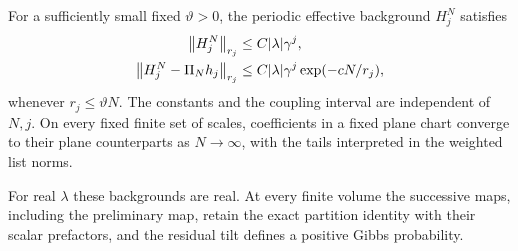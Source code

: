 \begin{proposition}\label{flow:torus}
For a sufficiently small fixed $\vartheta>0$, the periodic effective
background $H_j^N$ satisfies
\begin{align}
 \left\|H_j^N\right\|_{r_j}&\le C|\lambda|\gamma^j,
                                      \label{flow:torus-small}\\
 \left\|H_j^N-\Pi_Nh_j\right\|_{r_j}
       &\le C|\lambda|\gamma^j
                      \exp(-cN/r_j), \label{flow:torus-error}
\end{align}
whenever $r_j\le\vartheta N$.  The constants and the coupling
interval are independent of $N,j$.  On every fixed finite set of
scales, coefficients in a fixed plane chart converge to their plane
counterparts as $N\to\infty$, with the tails interpreted in the
weighted list norms.

For real $\lambda$ these backgrounds are real.  At every finite
volume the successive maps, including the preliminary map, retain
the exact partition identity with their scalar prefactors, and the
residual tilt defines a positive Gibbs probability.
\end{proposition}

